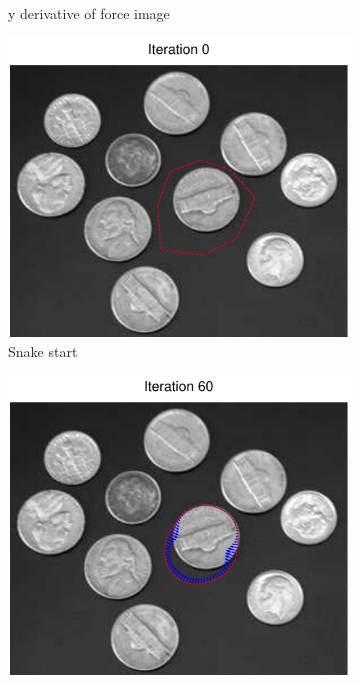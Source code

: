 \documentclass[11pt,a4paper]{article}
\begin{document}
\begin{figure}[H]
\begin{subfigure}[t]{0.21\textwidth}
        \caption{y derivative of force image}
        \label{fig:coins_fy}
    \end{subfigure}
    \begin{subfigure}[t]{0.21\textwidth}
        \includegraphics[width=\textwidth]{src/images/coins_gradient_0.pdf}
        \caption{Snake start}
        \label{fig:coins_0}
    \end{subfigure}
    \begin{subfigure}[t]{0.21\textwidth}
        \includegraphics[width=\textwidth]{src/images/coins_gradient_60.pdf}

\end{subfigure}
\end{figure}
\end{document}
